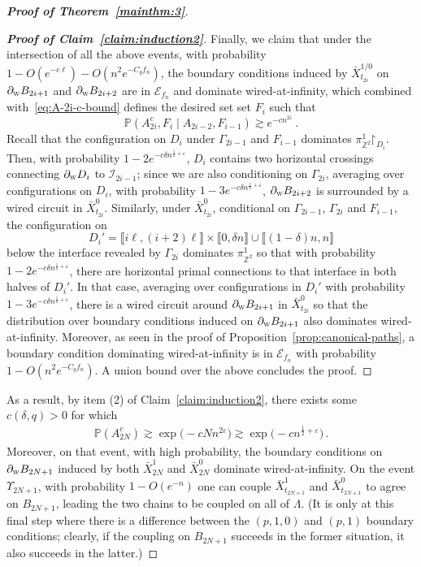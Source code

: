 \documentclass[reqno,11pt]{amsart}
\numberwithin{equation}{section}
\renewcommand{\restriction}{\mathord{\upharpoonright}}
\renewcommand{\epsilon}{\varepsilon}
\theoremstyle{definition}{
\newtheorem{example}[theorem]{Example}
\newtheorem{definition}[theorem]{Definition}
\newtheorem*{definition*}{Definition}
\newtheorem{problem}[theorem]{Problem}
\newtheorem{question}[theorem]{Question}
\newtheorem{remark}[theorem]{Remark}
}
\newcommand{\llb }{\llbracket}
\newcommand{\rrb }{\rrbracket}
\renewcommand{\epsilon}{\varepsilon}
\newcommand{\west}{{\textsc{w}}}
\begin{document}
\begin{proof}[\textbf{\emph{Proof of Theorem~\ref{mainthm:3}}}]
\begin{proof}[\textbf{\emph{Proof of Claim~\ref{claim:induction2}}}]
Finally, we claim that under the intersection of all the above events, with probability $1-O(e^{-c\ell})-O(n^2 e^{-C_q f_n})$, the boundary conditions induced by $\bar X^{1/0}_{t_{2i}}$ on $\partial_\west B_{2i+1}$ and $\partial_\west B_{2i+2}$ are in $\mathcal E_{f_n}$ and dominate wired-at-infinity, which combined with~\eqref{eq:A-2i-c-bound} defines the desired set set $F_i$ such that 
$$\mathbb P(A_{2i}^c, F_{i} \mid A_{2i-2}, F_{i-1}) \gtrsim e^{-cn^{2\epsilon}}\,.$$
 Recall that the configuration on $D_i$ under $ \Gamma_{2i-1}$ and $F_{i-1}$ dominates $\pi_{\mathbb Z^2}^1 \restriction_{D_i}$. Then, with probability $1-2e^{-c\delta n^{\frac 12+\epsilon}}$, $D_i$ contains two horizontal crossings connecting $\partial_\west D_i$ to $\mathcal I_{2i-1}$; since we are also conditioning on $ \Gamma_{2i}$, averaging over configurations on $D_i$, with probability $1-3e^{-c\delta n^{\frac 12+\epsilon}}$, $\partial_\west B_{2i+2}$ is surrounded by a wired circuit in $\bar X^0_{t_{2i}}$. Similarly, under $\bar X^0_{t_{2i}}$, conditional on $ \Gamma_{2i-1}$, $ \Gamma_{2i}$ and $F_{i-1}$, the configuration on 
\[
D_i'= \llb i\ell, (i+2)\ell \rrb \times \llb 0,\delta n\rrb \cup \llb (1-\delta) n,n\rrb
\]
below the interface revealed by $ \Gamma_{2i}$ dominates $\pi_{\mathbb Z^2}^1$ so that with probability $1-2e^{-c\delta n^{\frac 12+\epsilon}}$, there are horizontal primal connections to that interface in both halves of $D_i'$. In that case, averaging over configurations in $D_i'$ with probability $1-3e^{-c\delta  n^{\frac 12+\epsilon}}$, there is a wired circuit around $\partial_\west B_{2i+1}$ in $\bar X^0_{t_{2i}}$ so that the distribution over boundary conditions induced on $\partial_\west B_{2i+1}$ also dominates wired-at-infinity. Moreover, as seen in the proof of Proposition~\ref{prop:canonical-paths}, a boundary condition dominating wired-at-infinity is in $\mathcal E_{f_n}$ with probability $1-O(n^2 e^{-C_q f_n})$. A union bound over the above concludes the proof. \end{proof}

As a result, by item (2) of  Claim~\ref{claim:induction2}, there exists some $c(\delta,q)>0$ for which
\begin{align*}
\mathbb P(A_{2N}^c) \gtrsim \exp\big(-cN n^{2\epsilon}\big) \gtrsim \exp\big(-cn^{ \frac12 +\epsilon}\big)\,.
\end{align*}
Moreover, on that event, with high probability, the boundary conditions on $\partial_\west B_{2N+1}$ induced by both $\bar X^{1}_{2N}$ and $\bar X^0_{2N}$ dominate wired-at-infinity. On the event $\Upsilon_{2N+1}$, with probability $1-O(e^{-n})$ one can couple $\bar X_{t_{2N+1}}^1$ and $\bar X_{t_{2N+1}}^0$ to agree on $B_{2N+1}$, leading the two chains to be coupled on all of $\Lambda$. 
%
(It is only at this final step where there is a difference between the $(p,1,0)$ and $(p,1)$ boundary conditions; clearly, if the coupling on $B_{2N+1}$ succeeds in the former situation, it also succeeds in the latter.) 
\end{proof}
\end{document}
